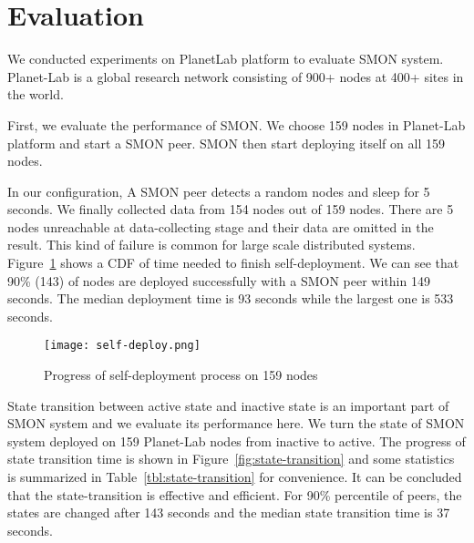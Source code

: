\section{Evaluation}
\label{sec:eval}

We conducted experiments on PlanetLab platform to evaluate
SMON system. Planet-Lab is a global research network
consisting of 900+ nodes at 400+ sites in the world.

%

First, we evaluate the performance of SMON. We choose 159
nodes in Planet-Lab platform and start a SMON peer. SMON
then start deploying itself on all 159 nodes.

In our configuration, A SMON peer detects a random nodes and
sleep for 5 seconds. We finally collected data from 154
nodes out of 159 nodes. There are 5 nodes unreachable at
data-collecting stage and their data are omitted in the
result. This kind of failure is common for large scale
distributed systems.  Figure~\ref{fig:self-deploy} shows a
CDF of time needed to finish self-deployment. We can see
that 90\% (143) of nodes are deployed successfully with a
SMON peer within 149 seconds. The median deployment time is
93 seconds while the largest one is 533 seconds. 

\begin{figure}
\centering
\texttt{[image: self-deploy.png]}
\caption{Progress of self-deployment process on 159
nodes}
\label{fig:self-deploy}
\end{figure}

State transition between active state and inactive state is
an important part of SMON system and we evaluate its
performance here. We turn the state of SMON system deployed
on 159 Planet-Lab nodes from inactive to active.  The
progress of state transition time is shown in
Figure~\ref{fig:state-transition} and some statistics is
summarized in Table~\ref{tbl:state-transition} for
convenience. It can be concluded that the state-transition
is effective and efficient. For 90\% percentile of peers,
the states are changed after 143 seconds and the median
state transition time is 37 seconds.

